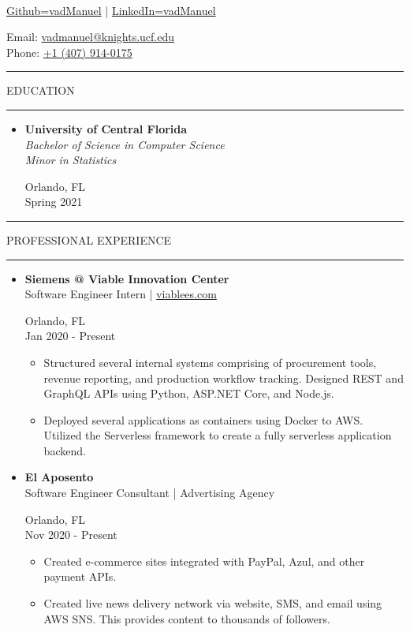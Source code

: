 \documentclass{article}
\makeatletter
\newcommand{\name}{Manuel Vasquez}
\newcommand{\website}{\href{https://www.github.com/vadmanuel}{Github=vadManuel} | \href{https://www.linkedin.com/in/vadmanuel}{LinkedIn=vadManuel}}
\newcommand{\email}{\href{mailto:vadmanuel@knights.ucf.edu}{vadmanuel@knights.ucf.edu}}
\newcommand{\phone}{\href{tel:+14079140175}{+1 (407) 914-0175}}
\newcommand{\makeminipage}[4]{
    \begin{minipage}[c]{.7\linewidth} 
        \flushleft #1 \\ #2
    \end{minipage} \hfill
    \begin{minipage}[c]{.29\linewidth}
        \flushright #3 \\ #4
    \end{minipage}
}
\newcommand{\makesection}[1]{\hrule\vskip1mm\uppercase{#1}\vskip1mm\hrule}
\makeatother
\begin{document}
\setlength{\parindent}{0cm}

\makeminipage
    {{\large\textbf{\name}}}
    {\website}
    {Email: \email}
    {Phone: \phone}
\bigbreak

\makesection{Education}
\begin{itemize}[leftmargin=.35cm]
    \item {
    \makeminipage
        {\textbf{University of Central Florida}}
        {\textit{Bachelor of Science in Computer Science} \\
        \textit{Minor in Statistics}}
        {Orlando, FL}
        {Spring 2021}
    }
\end{itemize}

\begin{minipage}[t]{.69\linewidth}
    \makesection{Professional Experience}
    \begin{itemize}[leftmargin=.35cm]

        \item \makeminipage
            {\textbf{Siemens @ Viable Innovation Center}}
            {Software Engineer Intern | \href{https://wwww.viablees.com}{viablees.com}}
            {Orlando, FL}
            {Jan 2020 - Present}
            \vspace*{-1.5mm}
            \begin{itemize}[leftmargin=.35cm]
                \item Structured several internal systems comprising of procurement tools, revenue reporting, and production workflow tracking. Designed REST and GraphQL APIs using Python, ASP.NET Core, and Node.js.
                \item Deployed several applications as containers using Docker to AWS. Utilized the Serverless framework to create a fully serverless application backend.
            \end{itemize}

        \item \makeminipage
            {\textbf{El Aposento}}
            {Software Engineer Consultant | Advertising Agency}
            {Orlando, FL}
            {Nov 2020 - Present}
            \vspace*{-1.5mm}
            \begin{itemize}[leftmargin=.35cm]
                \item Created e-commerce sites integrated with PayPal, Azul, and other payment APIs.
                \item Created live news delivery network via website, SMS, and email using AWS SNS. This provides content to thousands of followers.
            \end{itemize}


\end{itemize}
\end{minipage}
\end{document}
